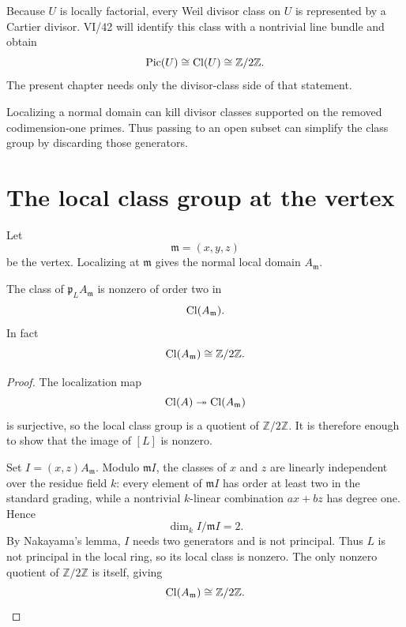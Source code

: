\begin{remark}[Preview of VI/42]
Because \(U\) is locally factorial, every Weil divisor class on \(U\) is represented by a Cartier divisor. VI/42 will identify this class with a nontrivial line bundle and obtain
\[
  \operatorname{Pic}(U)\cong\operatorname{Cl}(U)\cong\mathbb Z/2\mathbb Z.
\]
The present chapter needs only the divisor-class side of that statement.
\end{remark}

\begin{example}\label{ex:vi41-expand-03}
Localizing a normal domain can kill divisor classes supported on the removed codimension-one primes.  Thus passing to an open subset can simplify the class group by discarding those generators.
\end{example}
\section{The local class group at the vertex}

Let
\[
  \mathfrak m=(x,y,z)
\]
be the vertex. Localizing at \(\mathfrak m\) gives the normal local domain \(A_{\mathfrak m}\).

\begin{proposition}\label{prop:vi41-local-cone-class}
The class of \(\mathfrak p_LA_{\mathfrak m}\) is nonzero of order two in
\[
  \operatorname{Cl}(A_{\mathfrak m}).
\]
In fact
\[
  \operatorname{Cl}(A_{\mathfrak m})\cong\mathbb Z/2\mathbb Z.
\]
\end{proposition}

\begin{proof}
The localization map
\[
  \operatorname{Cl}(A)\twoheadrightarrow\operatorname{Cl}(A_{\mathfrak m})
\]
is surjective, so the local class group is a quotient of \(\mathbb Z/2\mathbb Z\). It is therefore enough to show that the image of \([L]\) is nonzero.

Set \(I=(x,z)A_{\mathfrak m}\). Modulo \(\mathfrak m I\), the classes of \(x\) and \(z\) are linearly independent over the residue field \(k\): every element of \(\mathfrak m I\) has order at least two in the standard grading, while a nontrivial \(k\)-linear combination \(ax+bz\) has degree one. Hence
\[
  \dim_k I/\mathfrak m I=2.
\]
By Nakayama's lemma, \(I\) needs two generators and is not principal. Thus \(L\) is not principal in the local ring, so its local class is nonzero. The only nonzero quotient of \(\mathbb Z/2\mathbb Z\) is itself, giving
\[
  \operatorname{Cl}(A_{\mathfrak m})\cong\mathbb Z/2\mathbb Z.
\]
\end{proof}

